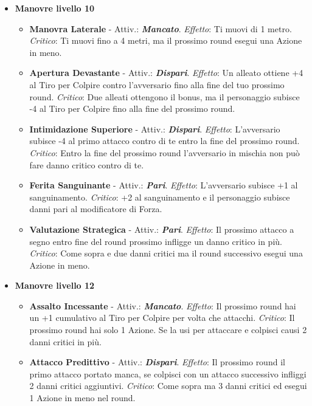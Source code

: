 \begin{multicols}{2}
\begin{itemize}[leftmargin=*]
	\item \textbf{Manovre livello 10}
	\begin{itemize}[leftmargin=*]
		\setlength{\itemsep}{0pt}
		\item \textbf{Manovra Laterale} - Attiv.: \textbf{\emph{Mancato}}. \emph{Effetto}: Ti muovi di 1 metro. \emph{Critico}: Ti muovi fino a 4 metri, ma il prossimo round esegui una Azione in meno.
		
		\item \textbf{Apertura Devastante} - Attiv.: \textbf{\emph{Dispari}}. \emph{Effetto}: Un alleato ottiene +4 al Tiro per Colpire contro l'avversario fino alla fine del tuo prossimo round. \emph{Critico}: Due alleati ottengono il bonus, ma il personaggio subisce -4 al Tiro per Colpire fino alla fine del prossimo round.
		
		\item \textbf{Intimidazione Superiore} - Attiv.: \textbf{\emph{Dispari}}. \emph{Effetto}: L'avversario subisce -4 al primo attacco contro di te entro la fine del prossimo round. \emph{Critico}: Entro la fine del prossimo round l'avversario in mischia non può fare danno critico contro di te.
		
		\item \textbf{Ferita Sanguinante} - Attiv.: \textbf{\emph{Pari}}. \emph{Effetto}: L'avversario subisce +1 al sanguinamento. \emph{Critico}: +2 al sanguinamento e il personaggio subisce danni pari al modificatore di Forza.
		
		\item \textbf{Valutazione Strategica} - Attiv.: \textbf{\emph{Pari}}. \emph{Effetto}: Il prossimo attacco a segno entro fine del round prossimo infligge un danno critico in più. \emph{Critico}: Come sopra e due danni critici ma il round successivo esegui una Azione in meno.
	\end{itemize}
	
	\item \textbf{Manovre livello 12}
	\begin{itemize}[leftmargin=*]
		\setlength{\itemsep}{0pt}
		\item \textbf{Assalto Incessante} - Attiv.: \textbf{\emph{Mancato}}. \emph{Effetto}: Il prossimo round hai un +1 cumulativo al Tiro per Colpire per volta che attacchi. \emph{Critico}: Il prossimo round hai solo 1 Azione. Se la usi per attaccare e colpisci causi 2 danni critici in più.
		
		\item \textbf{Attacco Predittivo} - Attiv.: \textbf{\emph{Dispari}}. \emph{Effetto}: Il prossimo round il primo attacco portato manca, se colpisci con un attacco successivo infliggi 2 danni critici aggiuntivi. \emph{Critico}: Come sopra ma 3 danni critici ed esegui 1 Azione in meno nel round.
		

\end{itemize}
\end{itemize}
\end{multicols}
